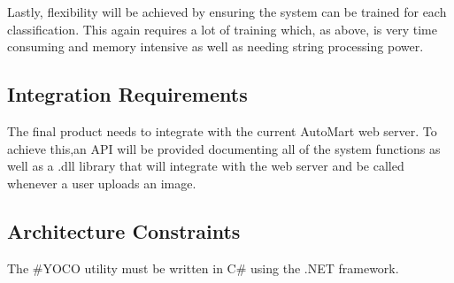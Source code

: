 Lastly, flexibility will be achieved by ensuring the system can be trained for each classification. This again requires a lot of training which, as above, is very time consuming and memory intensive as well as needing string processing power.

\subsection{Integration Requirements}
The final product needs to integrate with the current AutoMart web server. To achieve this,an API will be provided documenting all of the system functions as well as a .dll library that will integrate with the web server and be called whenever a user uploads an image.

\subsection{Architecture Constraints}
The \#YOCO utility must be written in C\# using the .NET framework.